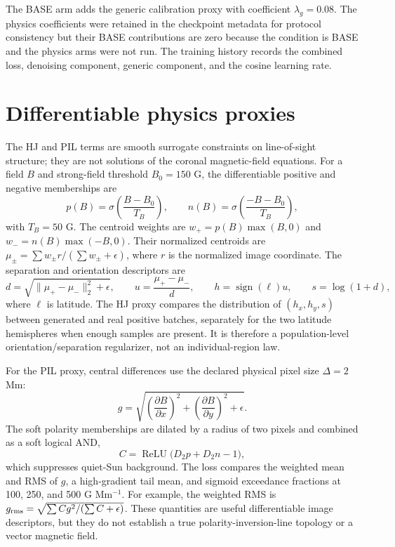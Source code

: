 \documentclass[11pt,oneside]{report}
\begin{document}
The BASE arm adds the generic calibration proxy with coefficient $\lambda_g=0.08$. The physics coefficients were retained in the checkpoint metadata for protocol consistency but their BASE contributions are zero because the condition is BASE and the physics arms were not run. The training history records the combined loss, denoising component, generic component, and the cosine learning rate.

\section{Differentiable physics proxies}

The HJ and PIL terms are smooth surrogate constraints on line-of-sight structure; they are not solutions of the coronal magnetic-field equations. For a field $B$ and strong-field threshold $B_0=150$ G, the differentiable positive and negative memberships are
\begin{equation}
  p(B)=\sigma\left(\frac{B-B_0}{T_B}\right), \qquad
  n(B)=\sigma\left(\frac{-B-B_0}{T_B}\right),
\end{equation}
with $T_B=50$ G. The centroid weights are $w_+=p(B)\max(B,0)$ and $w_-=n(B)\max(-B,0)$. Their normalized centroids are $\mu_\pm=\sum w_\pm r/(\sum w_\pm+\epsilon)$, where $r$ is the normalized image coordinate. The separation and orientation descriptors are
\begin{equation}
  d=\sqrt{\|\mu_+-\mu_-\|_2^2+\epsilon}, \qquad
  u=\frac{\mu_+-\mu_-}{d}, \qquad
  h=\operatorname{sign}(\ell)u, \qquad s=\log(1+d),
\end{equation}
where $\ell$ is latitude. The HJ proxy compares the distribution of $(h_x,h_y,s)$ between generated and real positive batches, separately for the two latitude hemispheres when enough samples are present. It is therefore a population-level orientation/separation regularizer, not an individual-region law.

For the PIL proxy, central differences use the declared physical pixel size $\Delta=2$ Mm:
\begin{equation}
  g=\sqrt{\left(\frac{\partial B}{\partial x}\right)^2+\left(\frac{\partial B}{\partial y}\right)^2+\epsilon}.
\end{equation}
The soft polarity memberships are dilated by a radius of two pixels and combined as a soft logical AND,
\begin{equation}
  C=\operatorname{ReLU}\bigl(D_2p+D_2n-1\bigr),
\end{equation}
which suppresses quiet-Sun background. The loss compares the weighted mean and RMS of $g$, a high-gradient tail mean, and sigmoid exceedance fractions at 100, 250, and 500 G Mm$^{-1}$. For example, the weighted RMS is $g_{\rm rms}=\sqrt{\sum Cg^2/(\sum C+\epsilon)}$. These quantities are useful differentiable image descriptors, but they do not establish a true polarity-inversion-line topology or a vector magnetic field.
\end{document}
